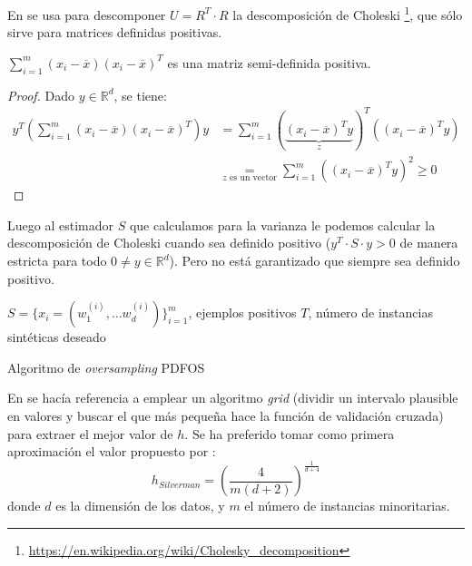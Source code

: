 En \citep{gao2014} se usa para descomponer $U = R^T \cdot R$ la descomposición de Choleski 
\footnote{\url{https://en.wikipedia.org/wiki/Cholesky_decomposition}}, que sólo sirve para matrices definidas positivas.

\begin{lemma}
 $\sum_{i=1}^m (x_i - \overline{x})(x_i - \overline{x})^T$ es una matriz semi-definida positiva.
\end{lemma}
\begin{proof}
 Dado $y \in \mathbb{R}^d$, se tiene:
 \begin{align*}
 y^T \left(\sum_{i=1}^m (x_i - \overline{x})(x_i - \overline{x})^T\right) y &=
 \sum_{i=1}^m ( \underbrace{(x_i - \overline{x})^T y}_z)^T ((x_i - \overline{x})^T y)\\
 &\underset{z \textrm{ es un vector}}{=} \sum_{i=1}^m ((x_i - \overline{x})^T y)^2 \ge 0
 \end{align*}
\end{proof}

Luego al estimador $S$ que calculamos para la varianza le podemos calcular la descomposición de Choleski cuando sea 
definido positivo ($y^T \cdot S\cdot y > 0$ de manera estricta para todo $0 \neq y\in \mathbb{R}^d$). Pero no está garantizado 
que siempre sea definido positivo.

\begin{algorithm}[H]
\begin{algorithmic}[1]
  \REQUIRE $S = \{x_i=(w_1^{(i)}, \ldots w_d^{(i)})\}_{i=1}^m$, ejemplos positivos
  \REQUIRE $T$, número de instancias sintéticas deseado
  \NEWLINE
  \ENDFOR
  \NEWLINE
\end{algorithmic}
\caption{Algoritmo de \textit{oversampling} PDFOS}
\label{alg:pdfos}
\end{algorithm}


En \citep{gao2014} se hacía referencia a emplear un algoritmo \textit{grid} (dividir un intervalo plausible en valores
y buscar el que más pequeña hace la función de validación cruzada) para extraer el mejor valor de $h$. Se ha preferido
tomar como primera aproximación el valor propuesto por \citep{silverman}:
\[
  h_{Silverman} = \left(\frac{4}{m(d+2)}\right)^{\frac{1}{d+4}}
\]
donde $d$ es la dimensión de los datos, y $m$ el número de instancias minoritarias. 

